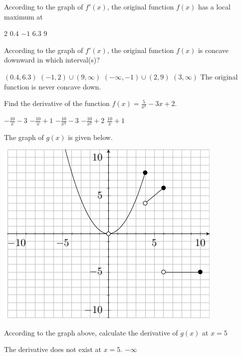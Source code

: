 \documentclass[11pt]{article}
\begin{document}
\begin{questions}
\begin{multiplechoice}{5}

\question According to the graph of $f'(x)$, the original function $f(x)$ has a local maximum at
\begin{answers}{3}
\ans $2$
\ans $0.4$
\ans $-1$
\ans $6.3$
\ans $9$
\end{answers}


\question According to the graph of $f'(x)$, the original function $f(x)$ is concave downward in which interval(s)?
\begin{answers}{3}
\ans $(0.4,6.3)$
\ans $(-1,2) \cup (9, \infty)$
\ans $(-\infty, -1) \cup (2,9)$
\ans $(3, \infty)$
\ans The original function is never concave down.
\end{answers}


\question Find the derivative of the function $f(x) = \frac{5}{x^2} - 3x + 2$.
\begin{answers}{2}
\ans $-\frac{10}{x} - 3$
\ans $-\frac{10}{x} + 1$
\ans $-\frac{10}{x^3} -3$
\ans $-\frac{10}{x^2} + 2$
\ans $\frac{10}{x} +1$
\end{answers}

\newpage

The graph of $g(x)$ is given below.\\

\begin{minipage}{\linewidth}%
\centering
\makebox[\linewidth]{}
\includegraphics{exam2graph2.pdf}
\label{graph2exam1}%
\end{minipage}
\question According to the graph above, calculate the derivative of $g(x)$ at $x = 5$
\begin{answers}{2}
\ans The derivative does not exist at $x=5$.
\ans $-\infty$
\end{answers}


\end{multiplechoice}
\end{questions}
\end{document}
